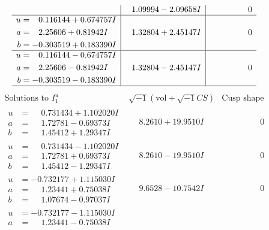 \documentclass[1p]{elsarticle_modified}
\theoremstyle{definition}
\newcommand{\I}{\sqrt{-1}}
\begin{document}
$$\begin{array}{c|c|c}
 & \phantom{-}1.09994 - 2.09658 I & \phantom{-0.000000 } 0 \\ \hline\begin{aligned}
u &= \phantom{-}0.116144 + 0.674757 I \\
a &= \phantom{-}2.25606 + 0.81942 I \\
b &= -0.303519 + 0.183390 I\end{aligned}
 & \phantom{-}1.32804 + 2.45147 I & \phantom{-0.000000 } 0 \\ \hline\begin{aligned}
u &= \phantom{-}0.116144 - 0.674757 I \\
a &= \phantom{-}2.25606 - 0.81942 I \\
b &= -0.303519 - 0.183390 I\end{aligned}
 & \phantom{-}1.32804 - 2.45147 I & \phantom{-0.000000 } 0\\
 \hline 
 \end{array}$$\newpage$$\begin{array}{c|c|c}  
\text{Solutions to }I^u_{1}& \I (\text{vol} + \sqrt{-1}CS) & \text{Cusp shape}\\
 \hline 
\begin{aligned}
u &= \phantom{-}0.731434 + 1.102020 I \\
a &= \phantom{-}1.72781 - 0.69373 I \\
b &= \phantom{-}1.45412 + 1.29347 I\end{aligned}
 & \phantom{-}8.2610 + 19.9510 I & \phantom{-0.000000 } 0 \\ \hline\begin{aligned}
u &= \phantom{-}0.731434 - 1.102020 I \\
a &= \phantom{-}1.72781 + 0.69373 I \\
b &= \phantom{-}1.45412 - 1.29347 I\end{aligned}
 & \phantom{-}8.2610 - 19.9510 I & \phantom{-0.000000 } 0 \\ \hline\begin{aligned}
u &= -0.732177 + 1.115030 I \\
a &= \phantom{-}1.23441 + 0.75038 I \\
b &= \phantom{-}1.07674 - 0.97037 I\end{aligned}
 & \phantom{-}9.6528 - 10.7542 I & \phantom{-0.000000 } 0 \\ \hline\begin{aligned}
u &= -0.732177 - 1.115030 I \\
a &= \phantom{-}1.23441 - 0.75038 I \\

\end{aligned}
\end{array}$$
\end{document}
